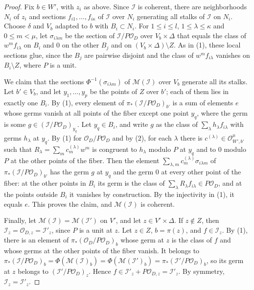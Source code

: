 \begin{proof}
Fix $b\in W'$, with $z_i$ as above. Since $\mathcal I$ is coherent, there are neighborhoods $N_i$ of $z_i$ and sections $f_{i1},\ldots,f_{i\kappa}$ of $\mathcal I$ over $N_i$ generating all stalks of $\mathcal I$ on $N_i$. Choose $\delta$ and $V_b$ adapted to $b$ with $B_i\subset N_i$. For $1\leq i\leq l$, $1\leq\lambda\leq\kappa$ and $0\leq m<\mu$, let $\sigma_{i\lambda m}$ be the section of $\mathcal I/P\mathcal O_D$ over $V_b\times\Delta$ that equals the class of $w^mf_{i\lambda}$ on $B_i$ and $0$ on the other $B_j$ and on $(V_b\times\Delta)\setminus Z$. As in (1), these local sections glue, since the $B_j$ are pairwise disjoint and the class of $w^mf_{i\lambda}$ vanishes on $B_i\setminus Z$, where $P$ is a unit.

We claim that the sections $\Phi^{-1}(\sigma_{i\lambda m})$ of $\mathcal M(\mathcal I)$ over $V_b$ generate all its stalks. Let $b'\in V_b$, and let $y_1,\ldots,y_p$ be the points of $Z$ over $b'$; each of them lies in exactly one $B_i$. By (1), every element of $\pi_*(\mathcal I/P\mathcal O_D)_{b'}$ is a sum of elements $e$ whose germs vanish at all points of the fiber except one point $y_q$, where the germ is some $g\in(\mathcal I/P\mathcal O_D)_{y_q}$. Let $y_q\in B_i$, and write $g$ as the class of $\sum_\lambda h_\lambda f_{i\lambda}$ with germs $h_\lambda$ at $y_q$. By (1) for $\mathcal O_D/P\mathcal O_D$ and by (2), for each $\lambda$ there is $c^{(\lambda)}\in\mathcal O_{W',b'}^\mu$ such that $R_\lambda=\sum_mc^{(\lambda)}_mw^m$ is congruent to $h_\lambda$ modulo $P$ at $y_q$ and to $0$ modulo $P$ at the other points of the fiber. Then the element $\sum_{\lambda,m}c^{(\lambda)}_m\sigma_{i\lambda m}$ of $\pi_*(\mathcal I/P\mathcal O_D)_{b'}$ has the germ $g$ at $y_q$ and the germ $0$ at every other point of the fiber: at the other points in $B_i$ its germ is the class of $\sum_\lambda R_\lambda f_{i\lambda}\in P\mathcal O_D$, and at the points outside $B_i$ it vanishes by construction. By the injectivity in (1), it equals $e$. This proves the claim, and $\mathcal M(\mathcal I)$ is coherent.

Finally, let $\mathcal M(\mathcal I)=\mathcal M(\mathcal I')$ on $V'$, and let $z\in V'\times\Delta$. If $z\notin Z$, then $\mathcal I_z=\mathcal O_{D,z}=\mathcal I'_z$, since $P$ is a unit at $z$. Let $z\in Z$, $b=\pi(z)$, and $f\in\mathcal I_z$. By (1), there is an element of $\pi_*(\mathcal O_D/P\mathcal O_D)_b$ whose germ at $z$ is the class of $f$ and whose germs at the other points of the fiber vanish. It belongs to $\pi_*(\mathcal I/P\mathcal O_D)_b=\Phi(\mathcal M(\mathcal I)_b)=\Phi(\mathcal M(\mathcal I')_b)=\pi_*(\mathcal I'/P\mathcal O_D)_b$, so its germ at $z$ belongs to $(\mathcal I'/P\mathcal O_D)_z$. Hence $f\in\mathcal I'_z+P\mathcal O_{D,z}=\mathcal I'_z$. By symmetry, $\mathcal I_z=\mathcal I'_z$.
\end{proof}

